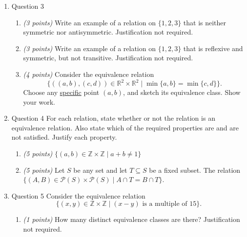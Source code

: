 \documentclass{amsart}
\begin{document}
\begin{enumerate}
\begin{enumerate}
\item Label the elements of the following poset in such a way that the matrix \(M_\zeta\) of the \(\zeta\) function is \uline{not} upper triangular.
Write down the matrix \(M_\zeta\) corresponding to your chosen labelling.
\begin{center}
\end{center}
\end{enumerate}
\item Question 3
\label{sec:orgece028a}
\begin{enumerate}
\item \emph{(3 points)} Write an example of a relation on \(\{1,2,3\}\) that is neither symmetric nor antisymmetric. Justification not required.
\item \emph{(3 points)} Write an example of a relation on \(\{1,2,3\}\) that is reflexive and symmetric, but not transitive. Justification not required.
\item \emph{(4 points)} Consider the equivalence relation
\[\{((a,b),(c,d)) \in \mathbb{R}^2 \times \mathbb{R}^2 \mid \min\{a,b\} = \min\{c,d\}\}.\]
Choose any \uline{specific} point \((a,b)\), and sketch its equivalence class.
Show your work.
\end{enumerate}
\item Question 4
\label{sec:org5097aa0}
For each relation, state whether or not the relation is an equivalence relation. Also state which of the required properties are and are not satisfied. Justify each property.
\begin{enumerate}
\item \emph{(5 points)} \(\{(a,b) \in \mathbb{Z} \times \mathbb{Z} \mid a + b \neq 1\}\)
\item \emph{(5 points)} Let \(S\) be any set and let \(T \subseteq S\) be a fixed subset. The relation \(\{(A,B) \in \mathcal{P}(S) \times \mathcal{P}(S) \mid A \cap T = B \cap T\}\).
\end{enumerate}
\item Question 5
\label{sec:orgd70139d}
Consider the equivalence relation
\[\{(x,y) \in \mathbb{Z} \times \mathbb{Z} \mid (x - y) \text{ is a multiple of }15\}.\]
\begin{enumerate}
\item \emph{(1 points)} How many distinct equivalence classes are there? Justification not required.


\end{enumerate}
\end{enumerate}
\end{document}
